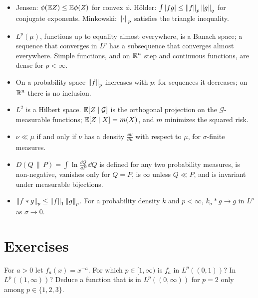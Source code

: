 \begin{notechapter}
\begin{chaptersummary}
\begin{itemize}[nosep]
  \item Jensen: $\phi(\mathbb{E} Z)\leq\mathbb{E}\phi(Z)$ for convex $\phi$. H\"older:
        $\int\left|fg\right|\leq\left\|f\right\|_p\left\|g\right\|_q$ for conjugate exponents.
        Minkowski: $\left\|\cdot\right\|_p$ satisfies the triangle inequality.
  \item $L^p(\mu)$, functions up to equality almost everywhere, is a
        Banach space; a sequence that converges in $L^p$ has a
        subsequence that converges almost everywhere. Simple functions,
        and on $\mathbb{R}^n$ step and continuous functions, are dense for
        $p < \infty$.
  \item On a probability space $\left\|f\right\|_p$ increases with $p$; for
        sequences it decreases; on $\mathbb{R}^n$ there is no inclusion.
  \item $L^2$ is a Hilbert space. $\mathbb{E}[Z\mid\mathcal G]$ is the
        orthogonal projection on the $\mathcal G$-measurable functions;
        $\mathbb{E}[Z\mid X] = m(X)$, and $m$ minimizes the squared risk.
  \item $\nu\ll\mu$ if and only if $\nu$ has a density
        $\frac{\dd\nu}{\dd\mu}$ with respect to $\mu$, for
        $\sigma$-finite measures.
  \item $D(Q\,\|\,P) = \int\ln\frac{\dd Q}{\dd P}\,\dd Q$ is defined for
        any two probability measures, is non-negative, vanishes only
        for $Q = P$, is $\infty$ unless $Q\ll P$, and is invariant under
        measurable bijections.
  \item $\left\|f*g\right\|_p\leq\left\|f\right\|_1\left\|g\right\|_p$. For a probability density
        $k$ and $p < \infty$, $k_\sigma*g\to g$ in $L^p$ as
        $\sigma\to0$.
\end{itemize}
\end{chaptersummary}

\section*{Exercises}

\begin{exercise}\label{lp-spaces:exr:1}
For $a > 0$ let $f_a(x) = x^{-a}$. For which $p\in[1, \infty)$ is $f_a$
in $L^p((0, 1))$? In $L^p((1, \infty))$? Deduce a function that is in
$L^p((0, \infty))$ for $p = 2$ only among $p\in\{1, 2, 3\}$.
\end{exercise}


\end{notechapter}
